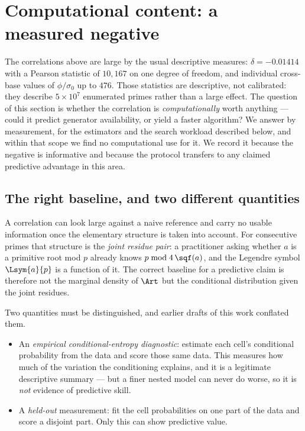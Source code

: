 \section{Computational content: a measured negative}
\label{sec:content}

The correlations above are large by the usual descriptive measures: $\delta = -0.01414$ with a
Pearson statistic of $10{,}167$ on one degree of freedom, and individual cross-base values of
$\phi/\sigma_0$ up to $476$. Those statistics are descriptive, not calibrated: they describe
$5 \times 10^7$ enumerated primes rather than a large effect. The question of this section is
whether the correlation is \emph{computationally} worth anything --- could it predict generator
availability, or yield a faster algorithm? We answer by measurement, for the estimators and the
search workload described below, and within that scope we find no computational use for it. We
record it because the negative is informative and because the protocol transfers to any claimed
predictive advantage in this area.

\subsection*{The right baseline, and two different quantities}
A correlation can look large against a naive reference and carry no usable information once the
elementary structure is taken into account. For consecutive primes that structure is the
\emph{joint residue pair}: a practitioner asking whether $a$ is a primitive root mod $p$ already
knows $p \bmod 4\,\sqf(a)$, and the Legendre symbol $\Lsym{a}{p}$ is a function of it. The correct
baseline for a predictive claim is therefore not the marginal density of $\Art$ but the
conditional distribution given the joint residues.

Two quantities must be distinguished, and earlier drafts of this work conflated them.

\begin{itemize}
	\item An \emph{empirical conditional-entropy diagnostic}: estimate each cell's conditional
	probability from the data and score those same data. This measures how much of the
	variation the conditioning explains, and it is a legitimate descriptive summary --- but a
	finer nested model can never do worse, so it is \emph{not} evidence of predictive skill.
	\item A \emph{held-out} measurement: fit the cell probabilities on one part of the data and
	score a disjoint part. Only this can show predictive value.
\end{itemize}

